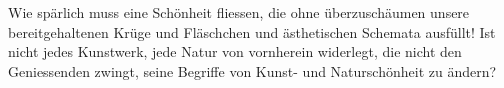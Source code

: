 Wie spärlich muss eine Schönheit fliessen, die ohne überzuschäumen unsere bereitgehaltenen Krüge und Fläschchen und ästhetischen Schemata ausfüllt! Ist nicht jedes Kunstwerk, jede Natur von vornherein widerlegt, die nicht den Geniessenden zwingt, seine Begriffe von Kunst- und Naturschönheit zu ändern?
\par

